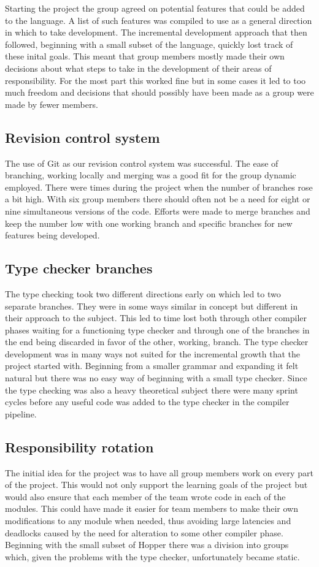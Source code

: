 Starting the project the group agreed on potential features that could be added to the language. A list of such features was compiled to use as a general direction in which to take development. The incremental development approach that then followed, beginning with a small subset of the language, quickly lost track of these inital goals. This meant that group members mostly made their own decisions about what steps to take in the development of their areas of responsibility. For the most part this worked fine but in some cases it led to too much freedom and decisions that should possibly have been made as a group were made by fewer members.

\subsection{Revision control system}

The use of Git as our revision control system was successful. The ease of branching, working locally and merging was a good fit for the group dynamic employed. 
There were times during the project when the number of branches rose a bit high. With six group members there should often not be a need for eight or nine simultaneous versions of the code. Efforts were made to merge branches and keep the number low with one working branch and specific branches for new features being developed.

\subsection{Type checker branches}

The type checking took two different directions early on which led to two separate branches. They were in some ways similar in concept but different in their approach to the subject. This led to time lost both through other compiler phases waiting for a functioning type checker and through one of the branches in the end being discarded in favor of the other, working, branch. The type checker development was in many ways not suited for the incremental growth that the project started with. Beginning from a smaller grammar and expanding it felt natural but there was no easy way of beginning with a small type checker. Since the type checking was also a heavy theoretical subject there were many sprint cycles before any useful code was added to the type checker in the compiler pipeline. 

\subsection{Responsibility rotation}

The initial idea for the project was to have all group members work on every part of the project. This would not only support the learning goals of the project but would also ensure that each member of the team wrote code in each of the modules. This could have made it easier for team members to make their own modifications to any module when needed, thus avoiding large latencies and deadlocks caused by the need for alteration to some other compiler phase. 
Beginning with the small subset of Hopper there was a division into groups which, given the problems with the type checker, unfortunately became static.
